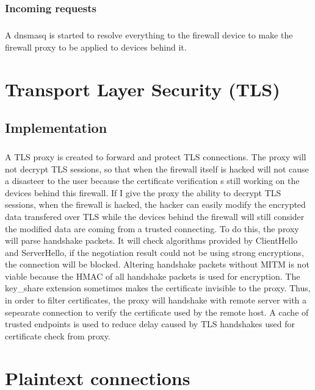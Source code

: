 \documentclass[mscthesis]{usiinfthesis}
\begin{document}
\subsection{Incoming requests}
\paragraph{}
A dnsmasq is started to resolve everything to the firewall device to make the firewall proxy to be applied to devices behind it.

\chapter{Transport Layer Security (TLS)}

\section{Implementation}
\paragraph{}
A TLS proxy is created to forward and protect TLS connections. The proxy will not decrypt TLS sessions, so that when the firewall itself is hacked will not cause a disasteer to the user because the certificate verification s still working on the devices behind this firewall. If I give the proxy the ability to decrypt TLS sessions, when the firewall is hacked, the hacker can easily modify the encrypted data transfered over TLS while the devices behind the firewall will still consider the modified data are coming from a trusted connecting. To do this, the proxy will parse handshake packets. It will check algorithms provided by ClientHello and ServerHello, if the negotiation result could not be using strong encryptions, the connection will be blocked. Altering handshake packets without MITM is not viable because the HMAC of all handshake packets is used for encryption. The key\_share extension sometimes makes the certificate invisible to the proxy. Thus, in order to filter certificates, the proxy will handshake with remote server with a sepearate connection to verify the certificate used by the remote host. A cache of trusted endpoints is used to reduce delay caused by TLS handshakes used for certificate check from proxy.


\chapter{Plaintext connections}
\end{document}
